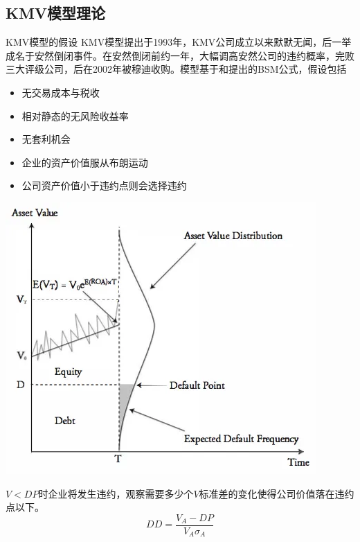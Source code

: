 \documentclass{ctexbeamer}
\begin{document}
\subsection{KMV模型理论}
\begin{frame}{KMV模型的假设}
    KMV模型提出于1993年，KMV公司成立以来默默无闻，后一举成名于安然倒闭事件。在安然倒闭前约一年，大幅调高安然公司的违约概率，完败三大评级公司，后在2002年被穆迪收购。模型基于\citet{black1973pricing}和\citet{merton1974pricing}提出的BSM公式，假设包括
    \begin{itemize}
        \item 无交易成本与税收
        \item 相对静态的无风险收益率
        \item 无套利机会
        \item 企业的资产价值服从布朗运动
        \item 公司资产价值小于违约点则会选择违约
    \end{itemize}
\end{frame}
\begin{frame}
    \begin{center}
        \includegraphics[width=0.6\linewidth]{img/KMV.png}
    \end{center}

    $V<DP$时企业将发生违约，观察需要多少个$V$标准差的变化使得公司价值落在违约点以下。
    \begin{equation*}
        DD=\frac{V_A-DP}{V_A\sigma_A}
    \end{equation*}
\end{frame}
\end{document}

